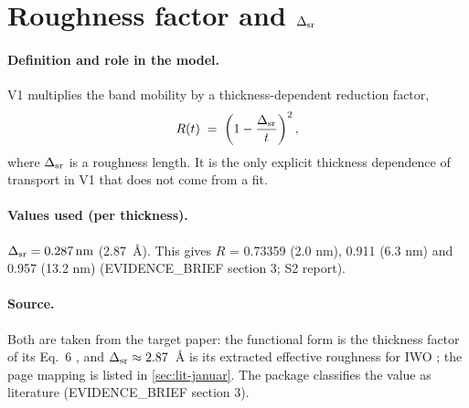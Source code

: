 \section{Roughness factor and \texorpdfstring{$\Delta_{\mathrm{sr}}$}{Delta\_sr}}\label{sec:par-rough}

\paragraph{Definition and role in the model.}
V1 multiplies the band mobility by a thickness-dependent reduction factor,
\begin{equation}
  R(t) \;=\; \left(1-\frac{\Delta_{\mathrm{sr}}}{t}\right)^{2},
  \label{eq:d2-rough}
\end{equation}
where $\Delta_{\mathrm{sr}}$ is a roughness length. It is the only explicit thickness dependence of transport in V1 that does not come from a fit.

\paragraph{Values used (per thickness).}
$\Delta_{\mathrm{sr}}=\SI{0.287}{nm}$ (\SI{2.87}{\angstrom}). This gives $R$ = 0.73359 (2.0 nm), 0.911 (6.3 nm) and 0.957 (13.2 nm) (EVIDENCE\_BRIEF section 3; S2 report).

\paragraph{Source.}
Both are taken from the target paper: the functional form is the thickness factor of its Eq.~6 \citep[p.~7]{Januar2026}, and $\Delta_{\mathrm{sr}}\approx2.87$~\AA{} is its extracted effective roughness for IWO \citep[p.~8]{Januar2026}; the page mapping is listed in \cref{sec:lit-januar}. The package classifies the value as literature (EVIDENCE\_BRIEF section 3).

